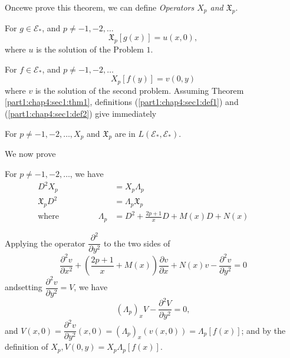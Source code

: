 Once\pageoriginale we prove this theorem, we can define
\textit{Operators $X_p$ and $\mathfrak{X}_p$}.
 
\begin{defn}\label{part1:chap4:sec1:def1}%
  For $g \in \mathscr{E}_{*}$, and $p \neq -1, -2, \ldots$
  $$
  \mathfrak{X}_p [g(x)] = u (x, 0),
  $$
  where $u$ is the solution of the Problem $1$.
\end{defn} 

\begin{defn}\label{part1:chap4:sec1:def2}%
  For $f \in \mathscr{E}_{*}$, and $p \neq -1, -2, \ldots$
  $$
  X_p [ f(y)] = v(0, y)
  $$
  where $v$ is the solution of the second problem. Assuming Theorem
  \ref{part1:chap4:sec1:thm1}, definitions
  (\ref{part1:chap4:sec1:def1}) and (\ref{part1:chap4:sec1:def2}) give
  immediately  
 \end{defn}

\begin{theorem}\label{part1:chap4:sec1:thm2}%
  For $p \neq -1, -2, \ldots, X_p$ and $\mathfrak{X}_p$ are in
  $L(\mathscr{E}_{*}, \mathscr{E}_{*})$. 
\end{theorem}  
  
We now prove
\begin{theorem}\label{part1:chap4:sec1:thm3}%
  For $p \neq -1, -2, \ldots$, we have
  \begin{align*}
  D^2 X_p &= X_p \Lambda_p \tag{4}\label{part1:chap4:sec1:eq4}\\
  \mathfrak{X}_p D^2 & = \Lambda_p \mathfrak{X}_p
  \tag{5}\label{part1:chap4:sec1:eq5}\\ 
    \text{where}\hspace{2cm}
    \Lambda_p & = D^2 + \frac{2p+1}{x}D + M(x) D+ N(x)\hspace{1cm}
    \tag{6}\label{part1:chap4:sec1:eq6} 
  \end{align*}
   
  Applying the operator $\dfrac{\partial^2}{\partial y^2}$ to the two
  sides of  
  $$
  \frac{\partial^2 v}{\partial x^2} + \left(\frac{2p+1}{x} + M (x)\right)
  \frac{\partial v}{\partial x} + N (x) v - \frac{\partial^2 v}{\partial
    y^2} = 0 
  $$
  and\pageoriginale setting $\dfrac{\partial^2 v}{\partial y^2} = V$, we have
  $$
  (\Lambda_p)_x V - \frac{\partial^2 V}{\partial y^2}= 0,
  $$
  and $V(x,0) = \dfrac{\partial^2 v}{\partial y^2} (x,0) =
  (\Lambda_p)_x (v(x,0))= \Lambda_p [f(x)]$; and by the definition of
  $X_p,  V(0, y) = X_p \Lambda _p [f(x)]$. 
\end{theorem}

